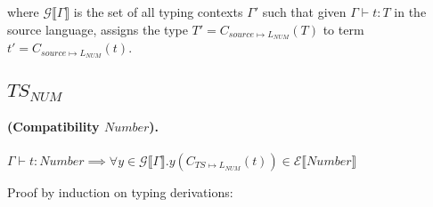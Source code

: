 \documentclass{article}
\newcommand{\denoteset}[2]{\mathcal{#1} \llbracket #2 \rrbracket}
\begin{document}
	where $\denoteset{G}{\Gamma}$ is the set of all typing contexts $\Gamma'$ such that given $\Gamma \vdash t: T$ in the source language, assigns the type $T' = C_{source \mapsto L_{NUM}}(T)$ to term $t' = C_{source \mapsto L_{NUM}}(t)$.
	
	\subsection{$TS_{NUM}$}
	
	\paragraph{(Compatibility $Number$).}
	$\Gamma \vdash t: Number \implies \forall y \in \denoteset{G}{\Gamma}. y(C_{TS \mapsto L_{NUM}}(t)) \in \denoteset{E}{Number}$
	
	Proof by induction on typing derivations:
	
\end{document}
